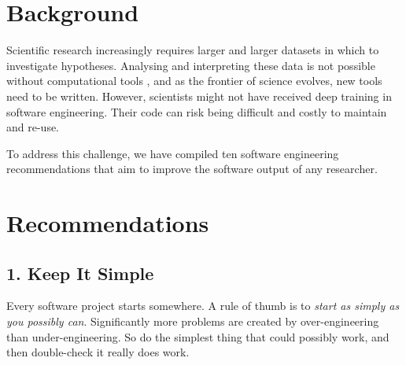 \documentclass{bmcart}
\begin{document}


\section*{Background}

Scientific research increasingly requires larger and larger datasets in which to investigate hypotheses. Analysing and interpreting these data is not possible without computational tools \cite{goble2014}, and as the frontier of science evolves, new tools need to be written. However, scientists might not have received deep training in software engineering. Their code can risk being difficult and costly to maintain and re-use. 

To address this challenge, we have compiled ten software engineering recommendations that aim to improve the software output of any researcher. 

\section*{Recommendations}

\subsection*{1. Keep It Simple}

Every software project starts somewhere. A rule of thumb is to \textit{start as simply as you possibly can}. Significantly more problems are created by over-engineering than under-engineering. So do the simplest thing that could possibly work, and then double-check it really does work. 
\end{document}
